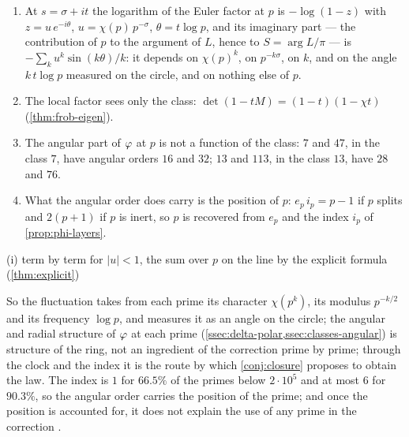 \begin{proposition}\label{prop:what-fluctuation-takes}
\begin{enumerate}[label=\textup{(\roman*)}]
  \item At $s=\sigma+it$ the logarithm of the Euler factor at $p$ is $-\log(1-z)$ with
    $z=u\,e^{-i\theta}$, $u=\chi(p)\,p^{-\sigma}$, $\theta=t\log p$, and its imaginary part --- the
    contribution of $p$ to the argument of $L$, hence to $S=\arg L/\pi$ --- is
    $-\sum_k u^k\sin(k\theta)/k$: it depends on $\chi(p)^k$, on $p^{-k\sigma}$, on $k$, and on the angle
    $k\,t\log p$ measured on the circle, and on nothing else of $p$.
  \item The local factor sees only the class: $\det(1-tM)=(1-t)(1-\chi t)$ (\cref{thm:frob-eigen}).
  \item The angular part of $\varphi$ at $p$ is not a function of the class: $7$ and $47$, in the
    class $7$, have angular orders $16$ and $32$; $13$ and $113$, in the class $13$, have $28$ and $76$.
    \item What the angular order does carry is the
    position of $p$: $e_p\,i_p=p-1$ if $p$ splits and
    $2(p+1)$ if $p$ is inert, so $p$ is recovered from
    $e_p$ and the index $i_p$ of
    \cref{prop:phi-layers}.

\end{enumerate}


(i) term by term for $|u|<1$, the sum over $p$ on the line by the explicit formula (\cref{thm:explicit})
\end{proposition}

So the fluctuation takes from each prime its character $\chi(p^k)$, its modulus $p^{-k/2}$ and its
frequency $\log p$, and measures it as an angle on the
circle; the angular and radial structure of $\varphi$ at
each prime (\cref{ssec:delta-polar,ssec:classes-angular})
is structure of the ring, not an ingredient of the
correction prime by prime; through the clock and the
index it is the route by which \cref{conj:closure}
proposes to obtain the law.  The index is $1$ for $66.5\%$ of the primes below $2\cdot10^5$ and at most $6$ for
$90.3\%$, so the angular order carries the position of the prime; and once the position is
accounted for, it does not explain the use of any prime in the correction
.

